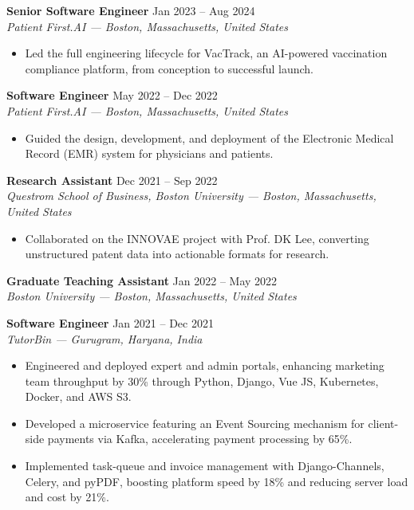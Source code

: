 \documentclass[10pt,a4paper]{article}
\newcommand{\entry}[3]{%
  \textbf{#1} \hfill {\small #3}\\
  {\itshape #2}\par
}
\begin{document}
\entry{Senior Software Engineer}{Patient First.AI --- Boston, Massachusetts, United States}{Jan 2023 -- Aug 2024}
\begin{itemize}
  \item Led the full engineering lifecycle for VacTrack, an AI-powered vaccination compliance platform, from conception to successful launch.
\end{itemize}

\entry{Software Engineer}{Patient First.AI --- Boston, Massachusetts, United States}{May 2022 -- Dec 2022}
\begin{itemize}
  \item Guided the design, development, and deployment of the Electronic Medical Record (EMR) system for physicians and patients.
\end{itemize}

\entry{Research Assistant}{Questrom School of Business, Boston University --- Boston, Massachusetts, United States}{Dec 2021 -- Sep 2022}
\begin{itemize}
  \item Collaborated on the INNOVAE project with Prof. DK Lee, converting unstructured patent data into actionable formats for research.
\end{itemize}

\entry{Graduate Teaching Assistant}{Boston University --- Boston, Massachusetts, United States}{Jan 2022 -- May 2022}

\entry{Software Engineer}{TutorBin --- Gurugram, Haryana, India}{Jan 2021 -- Dec 2021}
\begin{itemize}
  \item Engineered and deployed expert and admin portals, enhancing marketing team throughput by 30\% through Python, Django, Vue JS, Kubernetes, Docker, and AWS S3.
  \item Developed a microservice featuring an Event Sourcing mechanism for client-side payments via Kafka, accelerating payment processing by 65\%.
  \item Implemented task-queue and invoice management with Django-Channels, Celery, and pyPDF, boosting platform speed by 18\% and reducing server load and cost by 21\%.
\end{itemize}
\end{document}
